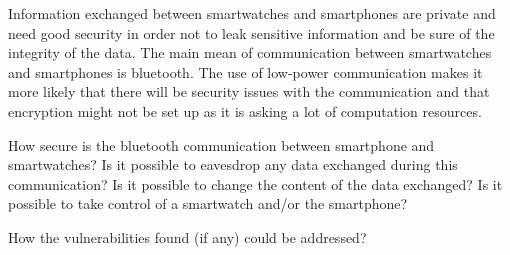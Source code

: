Information exchanged between smartwatches and smartphones are private and need good security in order not to leak sensitive information and be sure of the integrity of the data. 
The main mean of communication between smartwatches and smartphones is bluetooth.
The use of low-power communication makes it more likely that there will be security issues with the communication and that encryption might not be set up as it is asking a lot of computation resources. 

How secure is the bluetooth communication between smartphone and smartwatches?
Is it possible to eavesdrop any data exchanged during this communication?
Is it possible to change the content of the data exchanged?
Is it possible to take control of a smartwatch and/or the smartphone?

How the vulnerabilities found (if any) could be addressed?
